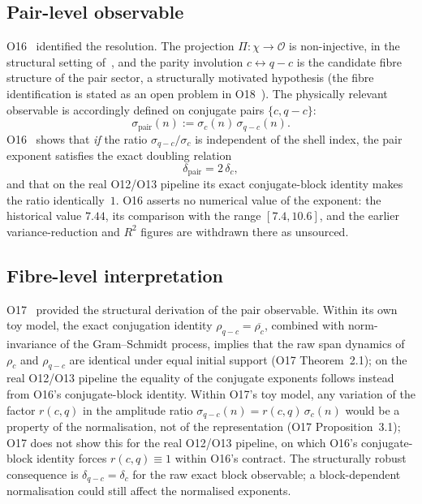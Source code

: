 \documentclass[11pt,a4paper]{article}
\theoremstyle{definition}
\theoremstyle{remark}
\begin{document}
    \subsection{Pair-level observable}
      \label{sec:pair-obs}

      O16~\cite{Beau2026a20} identified the resolution.
      The projection $\Pi : \chi \to \mathcal{O}$ is non-injective, in the
      structural setting of~\cite{Beau2026c}, and the parity involution
      $c \leftrightarrow q-c$ is the candidate fibre structure of the pair
      sector, a structurally motivated hypothesis
      (the fibre identification is stated as an open problem in O18~\cite{Beau2026a22}).
      The physically relevant observable is accordingly defined on
      conjugate pairs $\{c, q-c\}$:
      \begin{equation}
        \label{eq:sigma-pair}
        \sigma_{\mathrm{pair}}(n) := \sigma_c(n)\,\sigma_{q-c}(n).
      \end{equation}
      O16~\cite{Beau2026a20} shows that \emph{if} the ratio $\sigma_{q-c}/\sigma_c$ is
      independent of the shell index, the pair exponent satisfies the exact doubling relation
      \begin{equation}
        \label{eq:delta-doubling}
        \delta_{\mathrm{pair}} = 2\,\delta_c ,
      \end{equation}
      and that on the real O12/O13 pipeline its exact conjugate-block identity makes the ratio
      identically~$1$.
      O16 asserts no numerical value of the exponent: the historical value $7.44$, its
      comparison with the range $[7.4, 10.6]$, and the earlier variance-reduction and $R^2$
      figures are withdrawn there as unsourced.

    \subsection{Fibre-level interpretation}
      \label{sec:fibre-interp}

      O17~\cite{Beau2026a21} provided the structural derivation of the
      pair observable.
      Within its own toy model, the exact conjugation identity $\rho_{q-c} = \overline{\rho_c}$,
      combined with norm-invariance of the Gram--Schmidt process, implies
      that the raw span dynamics of $\rho_c$ and $\rho_{q-c}$ are
      identical under equal initial support (O17 Theorem~2.1); on the real O12/O13 pipeline the
      equality of the conjugate exponents follows instead from O16's conjugate-block identity.
      Within O17's toy model, any variation of the factor $r(c,q)$ in the
      amplitude ratio $\sigma_{q-c}(n) = r(c,q)\,\sigma_c(n)$ would be a property of
      the normalisation, not of the representation (O17 Proposition~3.1); O17 does not
      show this for the real O12/O13 pipeline, on which O16's conjugate-block identity
      forces $r(c,q) \equiv 1$ within O16's contract.
      The structurally robust consequence is $\delta_{q-c} = \delta_c$ for the raw exact block
      observable; a block-dependent normalisation could still affect the normalised exponents.
\end{document}
